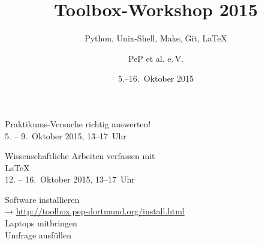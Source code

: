 \documentclass[9pt]{beamer}
\title[Toolbox 2015]{Toolbox-Workshop 2015}
\subtitle{Python, Unix-Shell, Make, Git, \LaTeX{}}
\date{5.–16.~Oktober 2015}
\institute[Pep et al.\ e.V.]{\texttt{[image: logos/pep.pdf]}}
\author{PeP et al. e.\,V.}
\begin{document}
\maketitle

\begin{frame}
  \begin{center}
  \Huge Praktikums-Versuche richtig auswerten!\\
  \Large 5. – 9.~Oktober 2015, 13–17~Uhr
  \end{center}
\end{frame}

\begin{frame}
  \begin{center}
    \Large Wissenschaftliche Arbeiten verfassen mit \\[0.5\baselineskip]
    \Huge \textrm{\LaTeX{}}\\[0.5\baselineskip]
    \Large 12. – 16.~Oktober 2015, 13–17~Uhr
  \end{center}
\end{frame}

\begin{frame}
  \begin{center}
    \LARGE
    Software installieren\\[0.5\baselineskip]
    → \textcolor{blue!70!black}{\url{http://toolbox.pep-dortmund.org/install.html}}\\[0.5\baselineskip]
    Laptops mitbringen\\[0.5\baselineskip]
    Umfrage ausfüllen
  \end{center}
\end{frame}
\end{document}
